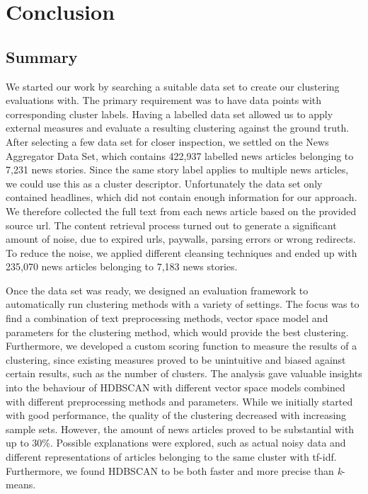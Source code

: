 \section{Conclusion}
\label{sec:6_conclusion}

\subsection{Summary}
\label{subsec:6_summary}

We started our work by searching a suitable data set to create our clustering evaluations with.
The primary requirement was to have data points with corresponding cluster labels.
Having a labelled data set allowed us to apply external measures
and evaluate a resulting clustering against the ground truth.
After selecting a few data set for closer inspection, we settled on the News Aggregator Data Set,
which contains 422,937 labelled news articles belonging to 7,231 news stories.
Since the same story label applies to multiple news articles, we could use this as a cluster descriptor.
Unfortunately the data set only contained headlines, which did not contain enough information for our approach.
We therefore collected the full text from each news article based on the provided source url.
The content retrieval process turned out to generate a significant amount of noise,
due to expired urls, paywalls, parsing errors or wrong redirects.
To reduce the noise, we applied different cleansing techniques
and ended up with 235,070 news articles belonging to 7,183 news stories.

Once the data set was ready, we designed an evaluation framework to automatically run clustering methods
with a variety of settings.
The focus was to find a combination of text preprocessing methods,
vector space model and parameters for the clustering method, which would provide the best clustering.
Furthermore, we developed a custom scoring function to measure the results of a clustering,
since existing measures proved to be unintuitive and biased against certain results,
such as the number of clusters.
The analysis gave valuable insights into the behaviour of HDBSCAN with different vector space models
combined with different preprocessing methods and parameters.
While we initially started with good performance, the quality of the clustering decreased with increasing sample sets.
However, the amount of news articles proved to be substantial with up to 30\%.
Possible explanations were explored,
such as actual noisy data and different representations of articles belonging to the same cluster with tf-idf.
Furthermore, we found HDBSCAN to be both faster and more precise than \textit{k}-means.

